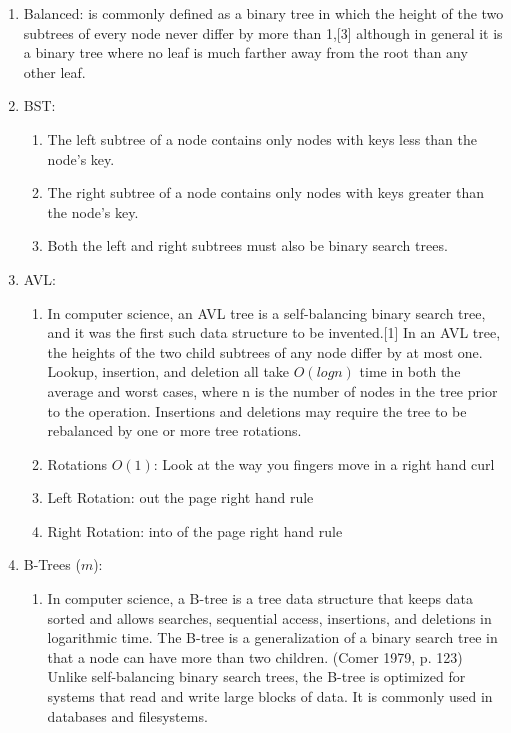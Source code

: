 \documentclass[12pt]{article}
\renewcommand{\=}[1]{\stackrel{#1}{=}} %
\theoremstyle{definition}
\theoremstyle{remark}
\begin{document}
\begin{enumerate}
\begin{enumerate}
\begin{enumerate}
      \item Balanced: is commonly defined as a binary tree in which the height of the two subtrees of every node never differ by more than 1,[3] although in general it is a binary tree where no leaf is much farther away from the root than any other leaf.
      \item BST:
        \begin{enumerate}
        \item The left subtree of a node contains only nodes with keys less than the node's key.
        \item The right subtree of a node contains only nodes with keys greater than the node's key.
        \item Both the left and right subtrees must also be binary search trees.
        \end{enumerate}
      \item AVL:
        \begin{enumerate}
        \item In computer science, an AVL tree is a self-balancing binary search tree, and it was the first such data structure to be invented.[1] In an AVL tree, the heights of the two child subtrees of any node differ by at most one. Lookup, insertion, and deletion all take $O(log n)$ time in both the average and worst cases, where n is the number of nodes in the tree prior to the operation. Insertions and deletions may require the tree to be rebalanced by one or more tree rotations.
        \item Rotations $O(1)$: Look at the way you fingers move in a
          right hand curl
        \item Left Rotation: out the page right hand rule
        \item Right Rotation: into of the page right hand rule
        \end{enumerate}
      \item B-Trees ($m$):
        \begin{enumerate}
        \item In computer science, a B-tree is a tree data structure
          that keeps data sorted and allows searches, sequential
          access, insertions, and deletions in logarithmic time. The
          B-tree is a generalization of a binary search tree in that a
          node can have more than two children. (Comer 1979, p. 123)
          Unlike self-balancing binary search trees, the B-tree is
          optimized for systems that read and write large blocks of
          data. It is commonly used in databases and filesystems.

\end{enumerate}
\end{enumerate}
\end{enumerate}
\end{enumerate}
\end{document}
